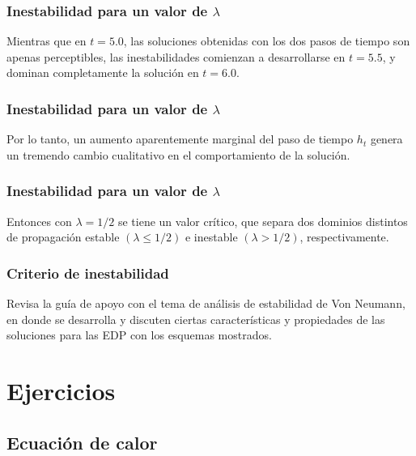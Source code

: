 \documentclass[12pt]{beamer}
\begin{document}
\begin{frame}
\frametitle{Inestabilidad para un valor de $\lambda$}
Mientras que en $t = 5.0$, las soluciones obtenidas con los dos pasos de tiempo son apenas perceptibles, las inestabilidades comienzan a desarrollarse en $t = 5.5$, y dominan completamente la solución en $t = 6.0$.
\end{frame}
\begin{frame}
\frametitle{Inestabilidad para un valor de $\lambda$}
Por lo tanto, un aumento aparentemente marginal del paso de tiempo $h_{t}$ genera un tremendo cambio cualitativo en el comportamiento de la solución.
\end{frame}
\begin{frame}
\frametitle{Inestabilidad para un valor de $\lambda$}
Entonces con $\lambda = 1/2$ se tiene un valor crítico, que separa dos dominios distintos de propagación estable $(\lambda \leq 1/2)$ e inestable $(\lambda > 1/2)$, respectivamente.
\end{frame}
\begin{frame}
\frametitle{Criterio de inestabilidad}
Revisa la guía de apoyo con el tema de análisis de estabilidad de Von Neumann, en donde se desarrolla y discuten ciertas características y propiedades de las soluciones para las EDP con los esquemas mostrados.
\end{frame}

\section{Ejercicios}
\subsection{Ecuación de calor}
\end{document}
